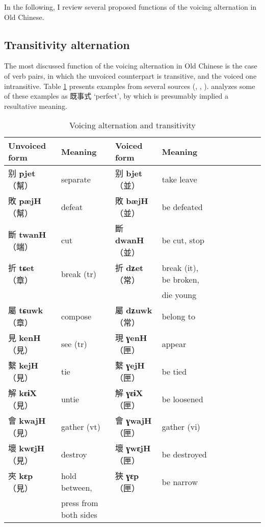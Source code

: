 \documentclass[oneside,a4paper,11pt]{article}
\newcommand{\ipa}[1]{\textbf{{\phon\mbox{#1}}}} %
\newcommand{\zh}[1]{{\cn #1}}
\newcommand{\zhc}[2]{\zh{#1} \ipa{#2}}
\newcommand{\mc}[1]{\zh{（#1）}}
\begin{document}
 
 In the following, I review several proposed functions of the voicing alternation in Old Chinese.
 
 \subsection{Transitivity alternation} \label{sec:oc.anticausative}
 The most discussed function of the voicing alternation in Old Chinese is the case of verb pairs, in which the unvoiced counterpart is transitive, and the voiced one intransitive. Table \ref{tab:voicing.transitivity} presents examples from several sources (\citealt[79-80; 86]{zhou62goucibian}, \citealt{downer73loanwords}, \citealt{sagart03prenasalized}). \citet[86]{zhou62goucibian} analyzes some of these examples as \zh{既事式}  `perfect', by which is presumably implied a resultative meaning.
 
\begin{table}[H]
\caption{Voicing alternation and transitivity} \label{tab:voicing.transitivity}
\begin{tabular}{llllllllll}
\toprule
Unvoiced form &Meaning & Voiced form & Meaning\\
\midrule
\zhc{别}{pjet} \mc{幫}	&separate & \zhc{别}{bjet} \mc{並} & take leave \\
\zhc{敗}{pæjH} \mc{幫}	&defeat & \zhc{敗}{bæjH} \mc{並} & be defeated \\
\midrule
\zhc{斷}{twanH} \mc{端}	&cut & \zhc{斷}{dwanH} \mc{並} & be cut, stop \\
\midrule
\zhc{折}{tɕet} \mc{章}	&break (tr) & \zhc{折}{dʑet} \mc{常} &break (it), be broken, \\
&&&die young \\
\zhc{屬}{tɕuwk} \mc{章}	&compose & \zhc{屬}{dʑuwk} \mc{常} &belong to \\
\midrule 
\zhc{見}{kenH} \mc{見}	&see (tr) & \zhc{現}{ɣenH} \mc{匣} & appear \\
\zhc{繫}{kejH} \mc{見}	&tie & \zhc{繫}{ɣejH} \mc{匣} & be tied \\
\zhc{解}{kɛɨX} \mc{見}	&untie & \zhc{解}{ɣɛɨX} \mc{匣} & be loosened \\
\zhc{會}{kwajH} \mc{見}	&gather (vt) & \zhc{會}{ɣwajH} \mc{匣} & gather (vi) \\
\zhc{壞}{kwɛjH} \mc{見}	&destroy  & \zhc{壞}{ɣwɛjH} \mc{匣} & be destroyed \\
\zhc{夾}{kɛp} \mc{見}	&hold between,   & \zhc{狹}{ɣɛp} \mc{匣} & be narrow \\
&press from both sides&&\\
\bottomrule
\end{tabular}
\end{table}
\end{document}
